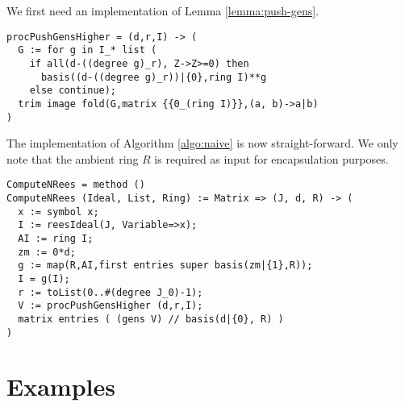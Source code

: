 \documentclass[fleqn,reqno]{amsart}
\numberwithin{first}{chapter}
\begin{document}
\begin{implementation}
We first need an implementation of Lemma \ref{lemma:push-gens}.
\label{code:lemma:push-gens}
\begin{verbatim}
procPushGensHigher = (d,r,I) -> (
  G := for g in I_* list (
    if all(d-((degree g)_r), Z->Z>=0) then
      basis((d-((degree g)_r))|{0},ring I)**g
    else continue);
  trim image fold(G,matrix {{0_(ring I)}},(a, b)->a|b)
)
\end{verbatim}
\end{implementation}

\begin{implementation}
\label{code:algo:naive}
The implementation of Algorithm \ref{algo:naive} is now straight-forward.
We only note that the ambient ring $R$ is required as input for encapsulation purposes.
\begin{verbatim}
ComputeNRees = method ()
ComputeNRees (Ideal, List, Ring) := Matrix => (J, d, R) -> (
  x := symbol x;
  I := reesIdeal(J, Variable=>x);
  AI := ring I;
  zm := 0*d;
  g := map(R,AI,first entries super basis(zm|{1},R));
  I = g(I);
  r := toList(0..#(degree J_0)-1);
  V := procPushGensHigher (d,r,I);
  matrix entries ( (gens V) // basis(d|{0}, R) )
)
\end{verbatim}
\end{implementation}



\section{Examples}
\label{sec:long-examples}
\end{document}
